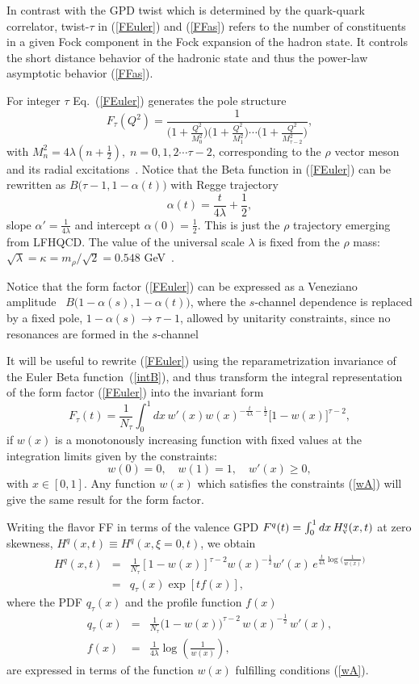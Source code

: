 \documentclass[aps,prl,reprint,groupedaddress, preprintnumbers]{revtex4-1}
\def\be{\begin{equation}}
\def\ee{\end{equation}}
\def\bea{\begin{eqnarray}}
\def\eea{\end{eqnarray}}
\newcommand{\half}{{\frac{1}{2}}}
\newcommand{\req}[1]{(\ref{#1})}
\begin{document}
In contrast with the GPD twist which is determined by the quark-quark correlator,  twist-$\tau$
in \req{FEuler} and \req{FFas}  refers to the number of constituents in a given Fock component in the Fock expansion of the hadron state. It  controls the short distance behavior of the hadronic state and thus the power-law asymptotic behavior \req{FFas}.


For integer $\tau$ Eq.~\req{FEuler} generates the pole structure~\cite{Brodsky:2007hb}
\be\label{Ftau}
 F_\tau(Q^2) =  \frac{1}{{\Big(1 + \frac{Q^2}{M^2_0} \Big) }
 \Big(1 + \frac{Q^2}{M^2_{1}}  \Big)  \cdots
 \Big(1  + \frac{Q^2}{M^2_{{\tau-2}}} \Big)} ,
\ee
with $M_n^2 = 4  \lambda  \left(n+\half \right), \; n=0, 1, 2 \cdots {\tau-2}$, corresponding to the $\rho$ vector meson and its radial excitations~\cite{Brodsky:2014yha}. Notice that the Beta function in \req{FEuler} can be rewritten as $B\big(\tau - 1, 1 - \alpha(t)\big)$ with Regge trajectory
\be \label{VMRT}
\alpha(t) = \frac{t}{4 \lambda} + \half,
\ee
slope $\alpha' = \frac{1}{4 \lambda}$ and intercept $\alpha(0) = \half$.  This is just the $\rho$ trajectory emerging from LFHQCD.  The value of the universal scale $\lambda$ is fixed from the $\rho$ mass: $\sqrt{\lambda} = \kappa = m_\rho/ \sqrt{2} = 0.548$ GeV~\cite{Brodsky:2014yha, Brodsky:2016yod}.


Notice that the form factor \req{FEuler} can be expressed as a Veneziano amplitude~\cite{Veneziano:1968yb} $B\big(1 - \alpha(s), 1 - \alpha(t)\big)$, where the $s$-channel dependence is replaced by a fixed pole, $1 - \alpha(s) \to \tau -1$, allowed by unitarity constraints, since no resonances are formed in the $s$-channel~\cite{Ademollo:1969wd, Bender:1970ew, Landshoff:1970ce}



It will be useful to rewrite \req{FEuler} using the  reparametrization invariance  of the Euler Beta function~\req{intB}, and thus transform the integral representation of the form factor \req{FEuler} into the invariant form
\be
F_\tau(t) = \frac{1}{N_\tau}  \int_0^1 dx \, w'(x) w(x)^{- \frac{t}{4 \lambda} - \half} \big[1- w(x)\big]^{\tau-2},
\ee
if $w(x)$ is a monotonously  increasing function with fixed values at the integration limits  given by the constraints:
\be \label{wA}
 w(0) = 0, \quad w(1) = 1, \quad  w'(x) \ge 0,
\ee
 with $x \in [0,1]$. Any function $w(x)$ which satisfies the constraints \req{wA} will give the same result for the form factor.


Writing the flavor FF in terms of the valence GPD $F^q(t) = \int_0^1 dx\,  H^q_{\rm v}(x,t)$ at zero skewness, $ H^q(x,t) \equiv  H^q(x, \xi = 0, t)$, we obtain
\bea \label{GPDexp}
H^q(x,t) &=&\frac{1}{N_\tau}[1-w(x)]^{\tau-2}w(x)^{-\frac{1}{2}}w'(x) \, e^{\frac{t}{4\lambda}\log\big(\frac{1}{w(x)}\big)}\nonumber\\
&=&q_\tau(x)\exp[tf(x)],
\eea
where the PDF $q_\tau(x)$ and the profile function $f(x)$
\bea \label{qx} 
q_\tau(x) &=& \frac{1}{N_\tau} \big(1- w(x)\big)^{\tau-2}\, w(x)^{- \half}\, w'(x), \\
 \label{fx}
f(x) &=& \frac{1}{4 \lambda} \log\left(\frac{1}{w(x)}\right), 
\eea
are expressed in terms of the function $w(x)$ fulfilling conditions \req{wA}.
\end{document}
